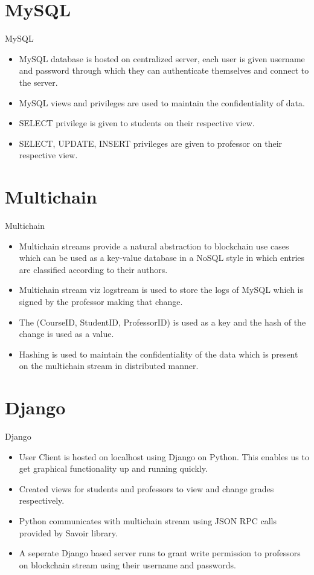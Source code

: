 \documentclass{beamer}
\begin{document}
\section{MySQL}
\begin{frame}{MySQL}
\begin{itemize}
\item MySQL database is hosted on centralized server, each user is given username and password through which they can authenticate themselves and connect to the server.
\item MySQL views and privileges are used to maintain the confidentiality of data.
\item SELECT privilege is given to students on their respective view.
\item SELECT, UPDATE, INSERT privileges are given to professor on their respective view.
\end{itemize}
\end{frame}

\section{Multichain}
\begin{frame}{Multichain}
\begin{itemize}
\item Multichain streams provide a natural abstraction to blockchain use cases which can be used as a key-value database in a NoSQL style in which entries are classified according to their authors.
\item Multichain stream viz logstream is used to store the logs of MySQL which is signed by the professor making that change.
\item The (CourseID, StudentID, ProfessorID) is used as a key and the hash of the change is used as a value.
\item Hashing is used to maintain the confidentiality of the data which is present on the multichain stream in distributed manner.
\end{itemize}
\end{frame}
\section{Django}
\begin{frame}{Django}
\begin{itemize}
\item User Client is hosted on localhost using Django on Python. This enables us to get graphical functionality up and running quickly.
\item Created views for students and professors to view and change grades respectively.
\item Python communicates with multichain stream using JSON RPC calls provided by Savoir library.
\item A seperate Django based server runs to grant write permission to professors on blockchain stream using their username and passwords.
\end{itemize}
\end{frame}
\end{document}
